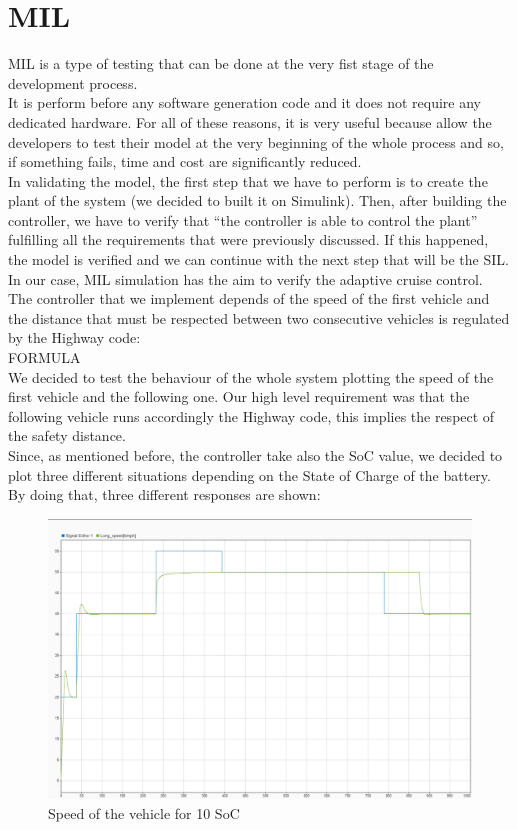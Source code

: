\documentclass[12pt,a4paper]{report}
\begin{document}
\section{MIL}
MIL is a type of testing that can be done at the very fist stage of the development process.\\
It is perform before any software generation code and it does not require any dedicated hardware. For all of these reasons, it is very useful because allow the developers to test their model at the very beginning of the whole process and so, if something fails, time and cost are significantly reduced. \\
In validating the model, the first step that we have to perform is to create the plant of the system (we decided to built it on Simulink). Then, after building the controller, we have to verify that “the controller is able to control the plant” fulfilling all the requirements that were previously discussed. If this happened, the model is verified and we can continue with the next step that will be the SIL.\\
In our case, MIL simulation has the aim to verify the adaptive cruise control. \\
The controller that we implement depends of the speed of the first vehicle and the distance that must be respected between two consecutive vehicles is regulated by the Highway code:\\
FORMULA\\
We decided to test the behaviour of the whole system plotting the speed of the first vehicle and the following one. Our high level requirement was that the following vehicle runs accordingly the Highway code, this implies the respect of the safety distance. \\
Since, as mentioned before, the controller take also the SoC value, we decided to plot three different situations depending on the State of Charge of the battery. By doing that, three different responses are shown:\\
\begin{figure}[htbp]
	\centering
	\includegraphics[scale=0.2]{10_soc.jpeg}
	\caption{Speed of the vehicle for 10 SoC}
\end{figure}
\end{document}
